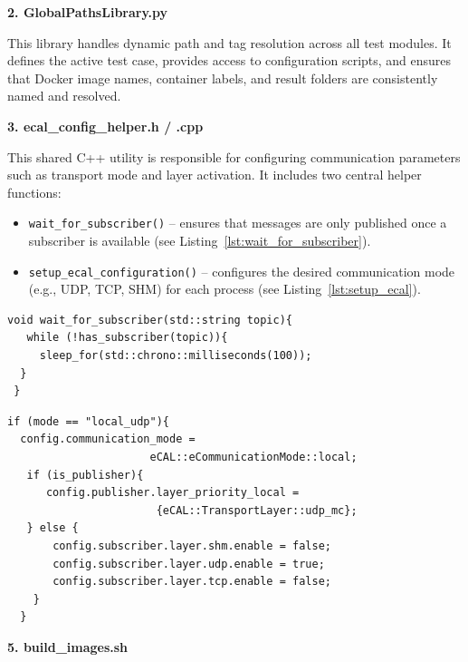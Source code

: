 \vspace{1em}
\textbf{2. GlobalPathsLibrary.py}

\vspace{0.3em}
This library handles dynamic path and tag resolution across all test modules. It defines the active test case, provides access to configuration scripts, and ensures that Docker image names, container labels, and result folders are consistently named and resolved.

\vspace{1em}
\textbf{3. ecal\_config\_helper.h / .cpp}

\vspace{0.3em}
This shared C++ utility is responsible for configuring communication parameters such as transport mode and layer activation. It includes two central helper functions:

\begin{itemize}
	\item \texttt{wait\_for\_subscriber()} – ensures that messages are only published once a subscriber is available (see Listing~\ref{lst:wait_for_subscriber}).
	\item \texttt{setup\_ecal\_configuration()} – configures the desired communication mode (e.g., UDP, TCP, SHM) for each process (see Listing~\ref{lst:setup_ecal}).
\end{itemize}

\begin{lstlisting}[style=cppstyle, caption={Simplified wait\_for\_subscriber logic}, label={lst:wait_for_subscriber}, captionpos=b]
 void wait_for_subscriber(std::string topic){
   while (!has_subscriber(topic)){
     sleep_for(std::chrono::milliseconds(100));
  }
 }
\end{lstlisting}

\clearpage
\begin{lstlisting}[style=cppstyle, caption={Partial example for UDP setup}, label={lst:setup_ecal}, captionpos=b]
 if (mode == "local_udp"){
  config.communication_mode = 
                      eCAL::eCommunicationMode::local;
   if (is_publisher){
      config.publisher.layer_priority_local = 
                       {eCAL::TransportLayer::udp_mc};
   } else {
       config.subscriber.layer.shm.enable = false;
       config.subscriber.layer.udp.enable = true;
       config.subscriber.layer.tcp.enable = false;
    }
  }
\end{lstlisting}

\vspace{1em}
\textbf{5. build\_images.sh}

